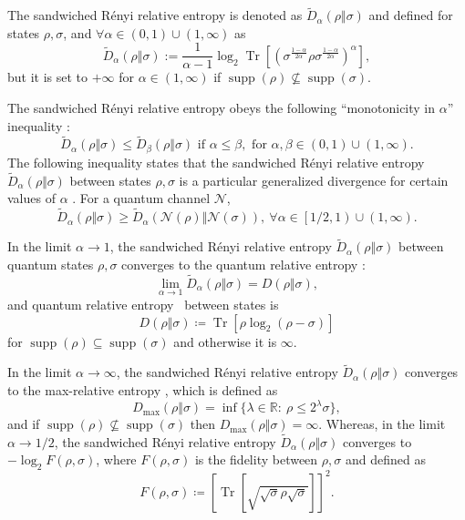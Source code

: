 \documentclass[aps,pra,twocolumn,superscriptaddress,longbibliography]{revtex4-1}
\def\Tr{\operatorname{Tr}}
\def\supp{\operatorname{supp}}
\def\){\right)}
\def\[{\left[}
\newcommand{\mc}[1]{\mathcal{#1}}
\newcommand{\wt}[1]{\widetilde{#1}}
\begin{document}
The sandwiched R\'enyi relative entropy  \cite{MDSFT13,WWY14} is denoted as $\wt{D}_\alpha(\rho\Vert\sigma)$  and defined for states
$\rho,\sigma$, and  $\forall \alpha\in (0,1)\cup(1,\infty)$ as
\begin{equation}\label{eq:def_sre}
\wt{D}_\alpha(\rho\Vert \sigma):= \frac{1}{\alpha-1}\log_2 \Tr\left[\left(\sigma^{\frac{1-\alpha}{2\alpha}}\rho\sigma^{\frac{1-\alpha}{2\alpha}}\right)^\alpha \right] ,
\end{equation}
but it is set to $+\infty$ for $\alpha\in(1,\infty)$ if $\supp(\rho)\nsubseteq \supp(\sigma)$.

The sandwiched R\'enyi relative entropy obeys the following ``monotonicity in $\alpha$'' inequality \cite{MDSFT13}:
\begin{equation}\label{eq:mono_sre}
\wt{D}_\alpha(\rho\Vert\sigma)\leq \wt{D}_\beta(\rho\Vert\sigma) \text{ if }  \alpha\leq \beta, \text{ for } \alpha,\beta\in(0,1)\cup(1,\infty).
\end{equation}
The following inequality states that the sandwiched R\'enyi relative entropy $\wt{D}_\alpha(\rho\Vert\sigma)$ between states $\rho,\sigma$ is a particular generalized divergence for certain values of $\alpha$ \cite{FL13,Bei13}. For a quantum channel $\mc{N}$,
\begin{equation}
\wt{D}_\alpha(\rho\Vert\sigma)\geq \wt{D}_\alpha(\mc{N}(\rho)\Vert\mc{N}(\sigma)), \ \forall \alpha\in \[1/2,1\)\cup (1,\infty).
\end{equation}


In the limit $\alpha\to 1$, the sandwiched R\'enyi relative entropy $\wt{D}_\alpha(\rho\Vert\sigma)$ between quantum states $\rho,\sigma$ converges to the quantum relative entropy \cite{MDSFT13,WWY14}:
\begin{equation}\label{eq:mono_renyi}
\lim_{\alpha\to 1}\wt{D}_\alpha(\rho\Vert\sigma)=D(\rho\Vert\sigma),
\end{equation}
and quantum relative entropy~\cite{Ume62} between states is
\begin{equation}
D(\rho\Vert\sigma)\coloneqq \Tr[\rho\log_2(\rho-\sigma)]
\end{equation}
for $\supp(\rho)\subseteq \supp(\sigma)$ and otherwise it is $\infty$. 

In the limit $\alpha\to \infty$, the sandwiched R\'enyi relative entropy $\wt{D}_\alpha(\rho\Vert\sigma)$ converges to the max-relative entropy \cite{MDSFT13}, which is defined as \cite{D09,Dat09}
\begin{equation}\label{eq:max-rel}
D_{\max}(\rho\Vert\sigma)=\inf\{\lambda\in\mathbb{R}:\ \rho \leq 2^\lambda\sigma\},
\end{equation}
and if $\supp(\rho)\nsubseteq\supp(\sigma)$ then $D_{\max}(\rho\Vert\sigma)=\infty$. Whereas, in the limit $\alpha\to 1/2$, the sandwiched R\'enyi relative entropy $\wt{D}_\alpha(\rho\Vert\sigma)$ converges to $-\log_2 F(\rho,\sigma)$, where $F(\rho,\sigma)$ is the fidelity between $\rho, \sigma$ and defined as
\begin{equation}
F(\rho,\sigma)\coloneqq \left[\Tr\left[\sqrt{\sqrt{\sigma}\rho\sqrt{\sigma}}\right]\right]^2.
\end{equation}
\end{document}
